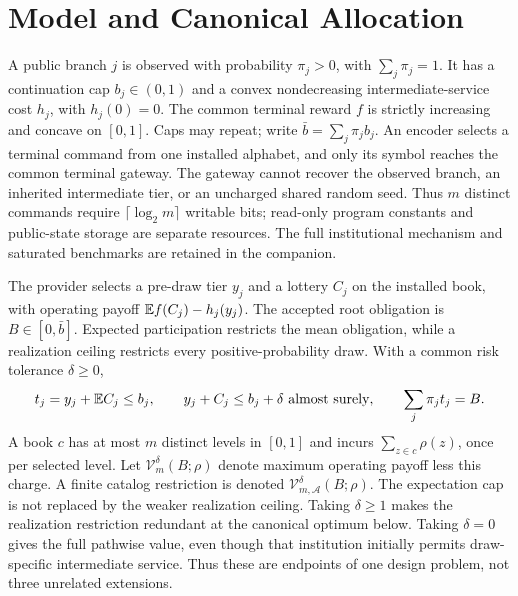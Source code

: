 \section{Model and Canonical Allocation}\label{sec:joint}
A public branch $j$ is observed with probability $\pi_j>0$, with $\sum_j\pi_j=1$. It has a continuation cap $b_j\in(0,1)$ and a convex nondecreasing intermediate-service cost $h_j$, with $h_j(0)=0$. The common terminal reward $f$ is strictly increasing and concave on $[0,1]$. Caps may repeat; write $\bar b=\sum_j\pi_jb_j$. An encoder selects a terminal command from one installed alphabet, and only its symbol reaches the common terminal gateway. The gateway cannot recover the observed branch, an inherited intermediate tier, or an uncharged shared random seed. Thus $m$ distinct commands require $\lceil\log_2m\rceil$ writable bits; read-only program constants and public-state storage are separate resources. The full institutional mechanism and saturated benchmarks are retained in the companion.

The provider selects a pre-draw tier $y_j$ and a lottery $C_j$ on the installed book, with operating payoff $\mathbb E f(C_j)-h_j(y_j)$. The accepted root obligation is $B\in[0,\bar b]$. Expected participation restricts the mean obligation, while a realization ceiling restricts every positive-probability draw. With a common risk tolerance $\delta\geq0$,
\begin{equation}\label{eq:unified-feasible}
 t_j=y_j+\mathbb E C_j\leq b_j,\qquad
 y_j+C_j\leq b_j+\delta\ \text{almost surely},\qquad
 \sum_j\pi_jt_j=B.
\end{equation}
A book $c$ has at most $m$ distinct levels in $[0,1]$ and incurs $\sum_{z\in c}\rho(z)$, once per selected level. Let $\mathcal V_m^\delta(B;\rho)$ denote maximum operating payoff less this charge. A finite catalog restriction is denoted $\mathcal V_{m,\mathcal A}^\delta(B;\rho)$. The expectation cap is not replaced by the weaker realization ceiling. Taking $\delta\geq1$ makes the realization restriction redundant at the canonical optimum below. Taking $\delta=0$ gives the full pathwise value, even though that institution initially permits draw-specific intermediate service. Thus these are endpoints of one design problem, not three unrelated extensions.

